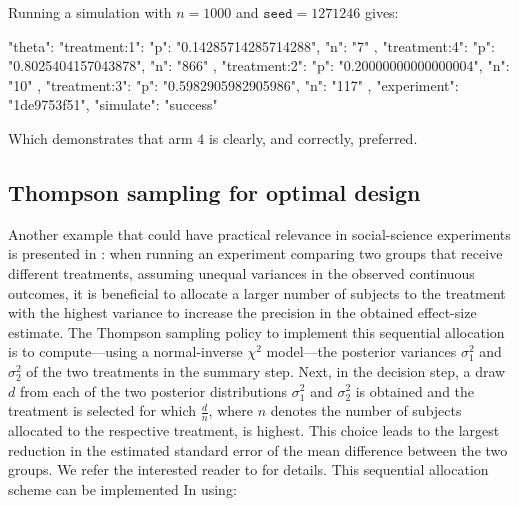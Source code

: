 \documentclass[nojss]{jss}
\begin{document}
Running a simulation with $n=1000$ and $\texttt{seed}=1271246$ gives:
\begin{Code}
{
    "theta": {
        "treatment:1": {
            "p": "0.14285714285714288",
            "n": "7"
        },
        "treatment:4": {
            "p": "0.8025404157043878",
            "n": "866"
        },
        "treatment:2": {
            "p": "0.20000000000000004",
            "n": "10"
        },
        "treatment:3": {
            "p": "0.5982905982905986",
            "n": "117"
        }
    },
    "experiment": "1de9753f51",
    "simulate": "success"
}
\end{Code}
Which demonstrates that arm $4$ is clearly, and correctly, preferred.

\subsection{Thompson sampling for optimal design}

Another example that could have practical relevance in social-science experiments is presented in \citet{Kaptein2014a}: when running an experiment comparing two groups that receive different treatments, assuming unequal variances in the observed continuous outcomes, it is beneficial to allocate a larger number of subjects to the treatment with the highest variance to increase the precision in the obtained effect-size estimate. The Thompson sampling policy to implement this sequential allocation is to compute---using a normal-inverse $\chi^2$ model---the posterior variances $\sigma^2_1$ and $\sigma^2_2$ of the two treatments in the summary step. Next, in the decision step, a draw $d$ from each of the two posterior distributions $\sigma^2_1$ and $\sigma^2_2$ is obtained and the treatment is selected for which $\frac{d}{n}$, where $n$ denotes the number of subjects allocated to the respective treatment, is highest. This choice leads to the largest reduction in the estimated standard error of the mean difference between the two groups. We refer the interested reader to \citet{Kaptein2014a} for details. This sequential allocation scheme can be implemented In  using:
\end{document}
